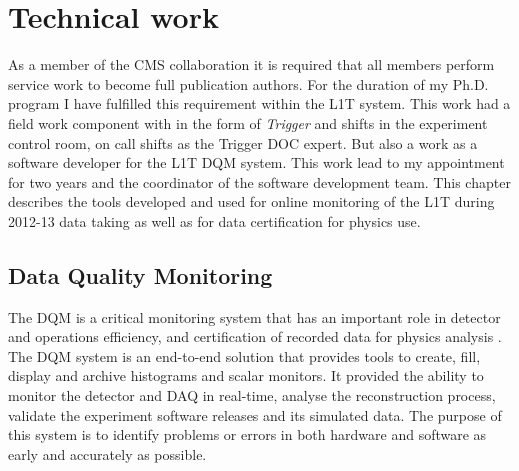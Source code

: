 \chapter{Technical work}
\label{CHAPTER:TechnicalWork}

\glsresetall %


As a member of the \gls{CMS} collaboration it is required that all members perform service work to become full publication authors. For the duration of my Ph.D. program I have fulfilled this requirement within the \gls{L1T} system. This work had a field work component with in the form of \textit{Trigger} and  shifts in the experiment control room, on call shifts as the Trigger \gls{DOC} expert. But also a work as a software developer for the \gls{L1T} \gls{DQM} system. This work lead to my appointment for two years and the coordinator of the software development team. This chapter describes the tools developed and used for online monitoring of the \gls{L1T} during 2012-13 data taking as well as for data certification for physics use.

\section{Data Quality Monitoring}
\label{SECTION:TechnicalWork_DataQualityMonitoring}


The \acrfull{DQM} is a critical monitoring system that has an important role in detector and operations efficiency, and certification of recorded data for physics analysis \cite{CMSTDR:CMSTridasTDRVol1,ARTICLE:CMSDataQualityMonitoringSoftWare_ExperienceAndFuture}. The \gls{DQM} system is an end-to-end solution that provides tools to create, fill, display and archive histograms and scalar monitors. It provided the ability to monitor the detector and \gls{DAQ} in real-time, analyse the reconstruction process, validate the experiment software releases and its simulated data. The purpose of this system is to identify problems or errors in both hardware and software as early and accurately as possible.

